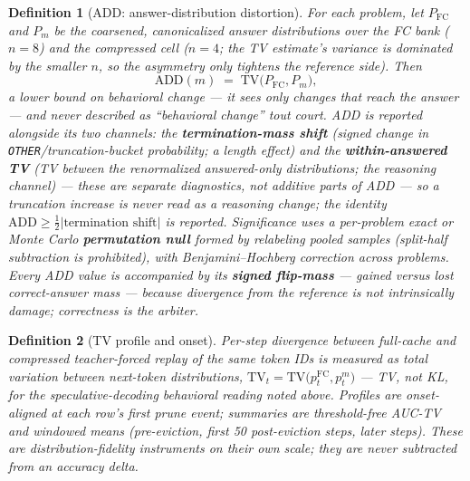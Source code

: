 \documentclass{article}
\newtheorem{definition}{Definition}
\newcommand{\TV}{\mathrm{TV}}
\newcommand{\ADD}{\mathrm{ADD}}
\begin{document}
\begin{definition}[ADD: answer-distribution distortion]
For each problem, let $P_{\mathrm{FC}}$ and $P_m$ be the coarsened, canonicalized answer distributions over the FC bank ($n{=}8$) and the compressed cell ($n{=}4$; the TV estimate's variance is dominated by the smaller $n$, so the asymmetry only tightens the reference side). Then
\begin{equation}
\ADD(m) \;=\; \TV\bigl(P_{\mathrm{FC}}, P_m\bigr),
\end{equation}
a \emph{lower bound} on behavioral change --- it sees only changes that reach the answer --- and never described as ``behavioral change'' tout court. ADD is reported alongside its two channels: the \textbf{termination-mass shift} (signed change in \texttt{OTHER}/truncation-bucket probability; a length effect) and the \textbf{within-answered TV} (TV between the \emph{renormalized} answered-only distributions; the reasoning channel) --- these are separate diagnostics, not additive parts of ADD --- so a truncation increase is never read as a reasoning change; the identity $\ADD \ge \tfrac{1}{2}\lvert \text{termination shift} \rvert$ is reported. Significance uses a per-problem exact or Monte Carlo \textbf{permutation null} formed by relabeling pooled samples (split-half subtraction is prohibited), with Benjamini--Hochberg correction across problems. Every ADD value is accompanied by its \textbf{signed flip-mass} --- gained versus lost correct-answer mass --- because divergence from the reference is not intrinsically damage; correctness is the arbiter.
\end{definition}

\begin{definition}[TV profile and onset]
Per-step divergence between full-cache and compressed \emph{teacher-forced replay} of the same token IDs is measured as total variation between next-token distributions, $\TV_t = \TV\bigl(p^{\mathrm{FC}}_t, p^{m}_t\bigr)$ --- TV, not KL, for the speculative-decoding behavioral reading noted above. Profiles are onset-aligned at each row's first prune event; summaries are threshold-free AUC-TV and windowed means (pre-eviction, first 50 post-eviction steps, later steps). These are distribution-fidelity instruments on their own scale; they are never subtracted from an accuracy delta.
\end{definition}
\end{document}
